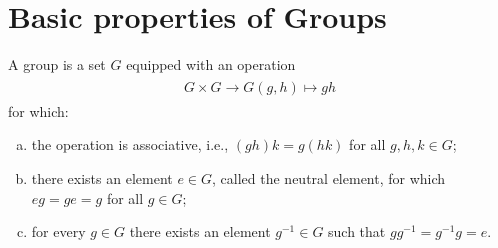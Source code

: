 \section{Basic properties of Groups}

\begin{definition}
	A group is a set $G$ equipped with an operation 
	\begin{align}
	\begin{split}
		G\times G\rightarrow G
		(g,h)\mapsto gh
	\end{split}
	\end{align}
for which:
	\begin{enumerate}[(a)]
		\item the operation is associative, i.e., $(gh)k=g(hk)$ for all $g,h,k\in G$;
		\item there exists an element $e\in G$, called the neutral element, for which $eg=ge=g$ for all $g\in G$;
		\item for every $g\in G$ there exists an element $g^{-1}\in G$ such that $gg^{-1}=g^{-1}g=e$.
	\end{enumerate}
\end{definition}